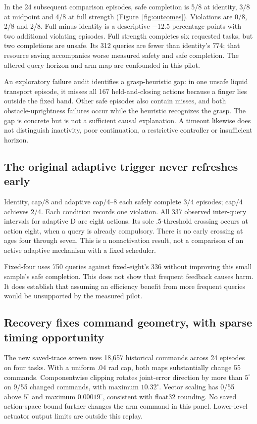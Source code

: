 \documentclass[sigconf,dvipsnames]{acmart}
\begin{document}
In the 24 subsequent comparison episodes, safe completion is 5/8 at identity, 3/8
at midpoint and 4/8 at full strength (Figure~\ref{fig:outcomes}). Violations are
0/8, 2/8 and 2/8. Full minus identity is a descriptive $-12.5$ percentage points
with two additional violating episodes. Full strength completes six requested
tasks, but two completions are unsafe. Its 312 queries are fewer than identity's
774; that resource saving accompanies worse measured safety and safe completion.
The altered query horizon and arm map are confounded in this pilot.

An exploratory failure audit identifies a grasp-heuristic gap: in one unsafe liquid
transport episode, it misses all 167 held-and-closing actions because a finger lies
outside the fixed band. Other safe episodes also contain misses, and both
obstacle-uprightness failures occur while the heuristic recognizes the grasp.
The gap is concrete but is not a sufficient causal explanation. A timeout likewise
does not distinguish inactivity, poor continuation, a restrictive controller or
insufficient horizon.

\subsection{The original adaptive trigger never refreshes early}
Identity, cap/8 and adaptive cap/4--8 each safely complete 3/4 episodes; cap/4
achieves 2/4. Each condition records one violation. All 337 observed inter-query
intervals for adaptive D are eight actions. Its sole .5-threshold crossing occurs
at action eight, when a query is already compulsory. There is no early crossing
at ages four through seven. This is a nonactivation result, not a comparison of
an active adaptive mechanism with a fixed scheduler.

Fixed-four uses 750 queries against fixed-eight's 336 without improving this small
sample's safe completion. This does not show that frequent feedback causes harm.
It does establish that assuming an efficiency benefit from more frequent queries
would be unsupported by the measured pilot.

\subsection{Recovery fixes command geometry, with sparse timing opportunity}
The new saved-trace screen uses 18,657 historical commands across 24 episodes on
four tasks. With a uniform .04 rad cap, both maps substantially change 55 commands.
Componentwise clipping rotates joint-error direction by more than $5^\circ$ on
9/55 changed commands, with maximum $10.32^\circ$. Vector scaling has 0/55 above
$5^\circ$ and maximum $0.00019^\circ$, consistent with float32 rounding. No saved
action-space bound further changes the arm command in this panel. Lower-level
actuator output limits are outside this replay.
\end{document}

